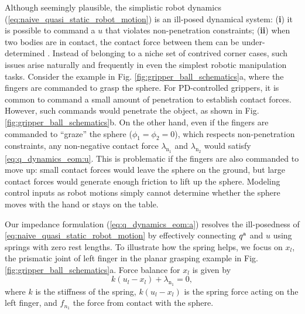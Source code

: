 Although seemingly plausible, the simplistic robot dynamics (\ref{eq:naive_quasi_static_robot_motion}) is an ill-posed dynamical system: (\textbf{i}) it is possible to command a $u$ that violates non-penetration constraints; (\textbf{ii}) when two bodies are in contact, the contact force between them can be under-determined \cite{pang2018robust, halm2018quasi}. Instead of belonging to a niche set of contrived corner cases, such issues arise naturally and frequently in even the simplest robotic manipulation tasks. Consider the example in Fig. \ref{fig:gripper_ball_schematics}a, where the fingers are commanded to grasp the sphere. For PD-controlled grippers, it is common to command a small amount of penetration to establish contact forces. However, such commands would penetrate the object, as shown in Fig. \ref{fig:gripper_ball_schematics}b. On the other hand, even if the fingers are commanded to ``graze'' the sphere ($\phi_1 = \phi_2 = 0$), which respects non-penetration constraints, any non-negative contact force $\lambda_{\mathrm{n}_1}$ and $\lambda_{\mathrm{n}_2}$ would satisfy \eqref{eq:q_dynamics_eom:u}. This is problematic if the fingers are also commanded to move up: small contact forces would leave the sphere on the ground, but large contact forces would generate enough friction to lift up the sphere. Modeling control inputs as robot motions simply cannot determine whether the sphere moves with the hand or stays on the table.

Our impedance formulation (\ref{eq:q_dynamics_eom:a}) resolves the ill-posedness of \eqref{eq:naive_quasi_static_robot_motion} by effectively connecting ${q^\mathrm{a}}$ and $u$ using springs with zero rest lengths. To illustrate how the spring helps, we focus on $x_l$, the prismatic joint of left finger in the planar grasping example in Fig. \ref{fig:gripper_ball_schematics}a. Force balance for $x_l$ is given by 
\begin{equation}
\label{eq:force_balance_xl}
    k(u_{l} - x_l) + \lambda_{\mathrm{n}_1} = 0,
\end{equation}
where $k$ is the stiffness of the spring, $k(u_{l} - x_l)$ is the spring force acting on the left finger, and $f_{n_1}$ the force from contact with the sphere.

